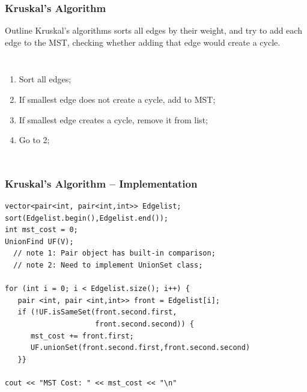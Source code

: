 \begin{frame}
  \frametitle{Kruskal's Algorithm}
  \begin{block}{Outline}
    Kruskal's algorithms sorts all edges by their weight, and try to add each edge to the MST, checking whether adding that edge would create a cycle.
  \end{block}

  \begin{columns}[T]
    \begin{enumerate}
    \item Sort all edges;
    \item If smallest edge does not create a cycle, add to MST;
    \item If smallest edge creates a cycle, remove it from list;
    \item Go to 2;
    \end{enumerate}
  \end{columns}
\end{frame}

\begin{frame}[fragile]
  \frametitle{Kruskal's Algorithm -- Implementation}
{\smaller
\begin{exampleblock}{}
\begin{verbatim}
vector<pair<int, pair<int,int>> Edgelist;
sort(Edgelist.begin(),Edgelist.end());
int mst_cost = 0;
UnionFind UF(V);
  // note 1: Pair object has built-in comparison;
  // note 2: Need to implement UnionSet class;

for (int i = 0; i < Edgelist.size(); i++) {
   pair <int, pair <int,int>> front = Edgelist[i];
   if (!UF.isSameSet(front.second.first,
                     front.second.second)) {
      mst_cost += front.first;
      UF.unionSet(front.second.first,front.second.second)
   }}

cout << "MST Cost: " << mst_cost << "\n"
\end{verbatim}
\end{exampleblock}
}
\end{frame}

